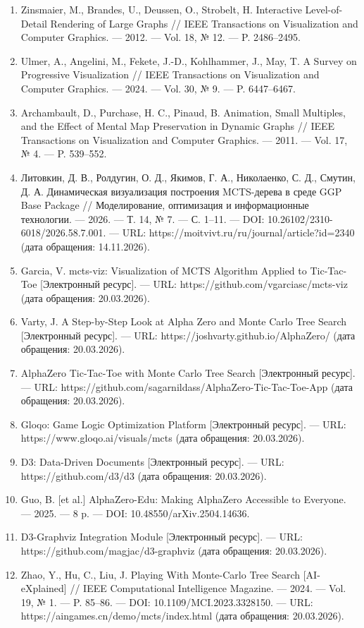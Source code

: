 \begin{enumerate}[label=\arabic*.]
  \item Zinsmaier, M., Brandes, U., Deussen, O., Strobelt, H. Interactive Level-of-Detail Rendering of Large Graphs // IEEE Transactions on Visualization and Computer Graphics. — 2012. — Vol. 18, № 12. — P. 2486–2495.
  \item Ulmer, A., Angelini, M., Fekete, J.-D., Kohlhammer, J., May, T. A Survey on Progressive Visualization // IEEE Transactions on Visualization and Computer Graphics. — 2024. — Vol. 30, № 9. — P. 6447–6467.
  \item Archambault, D., Purchase, H. C., Pinaud, B. Animation, Small Multiples, and the Effect of Mental Map Preservation in Dynamic Graphs // IEEE Transactions on Visualization and Computer Graphics. — 2011. — Vol. 17, № 4. — P. 539–552.
  \item Литовкин, Д. В., Ролдугин, О. Д., Якимов, Г. А., Николаенко, С. Д., Смутин, Д. А. Динамическая визуализация построения MCTS-дерева в среде GGP Base Package // Моделирование, оптимизация и информационные технологии. — 2026. — Т. 14, № 7. — С. 1–11. — DOI: 10.26102/2310-6018/2026.58.7.001. — URL: https://moitvivt.ru/ru/journal/article?id=2340 (дата обращения: 14.11.2026).
  \item Garcia, V. mcts-viz: Visualization of MCTS Algorithm Applied to Tic-Tac-Toe [Электронный ресурс]. — URL: https://github.com/vgarciasc/mcts-viz (дата обращения: 20.03.2026).
  \item Varty, J. A Step-by-Step Look at Alpha Zero and Monte Carlo Tree Search [Электронный ресурс]. — URL: https://joshvarty.github.io/AlphaZero/ (дата обращения: 20.03.2026).
  \item AlphaZero Tic-Tac-Toe with Monte Carlo Tree Search [Электронный ресурс]. — URL: https://github.com/sagarnildass/AlphaZero-Tic-Tac-Toe-App (дата обращения: 20.03.2026).
  \item Gloqo: Game Logic Optimization Platform [Электронный ресурс]. — URL: https://www.gloqo.ai/visuals/mcts (дата обращения: 20.03.2026).
  \item D3: Data-Driven Documents [Электронный ресурс]. — URL: https://github.com/d3/d3 (дата обращения: 20.03.2026).
  \item Guo, B. [et al.] AlphaZero-Edu: Making AlphaZero Accessible to Everyone. — 2025. — 8 p. — DOI: 10.48550/arXiv.2504.14636.
  \item D3-Graphviz Integration Module [Электронный ресурс]. — URL: https://github.com/magjac/d3-graphviz (дата обращения: 20.03.2026).
  \item Zhao, Y., Hu, C., Liu, J. Playing With Monte-Carlo Tree Search [AI-eXplained] // IEEE Computational Intelligence Magazine. — 2024. — Vol. 19, № 1. — P. 85–86. — DOI: 10.1109/MCI.2023.3328150. — URL: https://aingames.cn/demo/mcts/index.html (дата обращения: 20.03.2026).

\end{enumerate}
